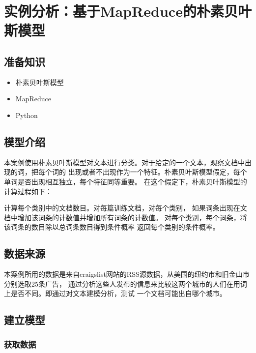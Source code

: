 \section{实例分析：基于MapReduce的朴素贝叶斯模型}\label{ux5b9eux4f8bux5206ux6790ux57faux4e8emapreduceux7684ux6734ux7d20ux8d1dux53f6ux65afux6a21ux578b}

\subsection{准备知识}\label{ux51c6ux5907ux77e5ux8bc6}

\begin{itemize}
\itemsep1pt\parskip0pt
\item
  朴素贝叶斯模型
\item
  MapReduce
\item
  Python
\end{itemize}

\subsection{模型介绍}\label{ux6a21ux578bux4ecbux7ecd}

本案例使用朴素贝叶斯模型对文本进行分类。对于给定的一个文本，观察文档中出现的词，把每个词的
出现或者不出现作为一个特征。朴素贝叶斯模型假定，每个单词是否出现相互独立，每个特征同等重要。
在这个假定下，朴素贝叶斯模型的计算过程如下：%

计算每个类别中的文档数目。对每篇训练文档，对每个类别，
如果词条出现在文档中增加该词条的计数值并增加所有词条的计数值。
对每个类别，每个词条，将该词条的数目除以总词条数目得到条件概率
返回每个类别的条件概率。

\subsection{数据来源}\label{ux6570ux636eux6765ux6e90}

本案例所用的数据是来自craigslist网站的RSS源数据，从美国的纽约市和旧金山市分别选取25条广告，
通过分析这些人发布的信息来比较这两个城市的人们在用词上是否不同。即通过对文本建模分析，测试
一个文档可能出自哪个城市。

\subsection{建立模型}\label{ux5efaux7acbux6a21ux578b}

\subsubsection{获取数据}\label{ux83b7ux53d6ux6570ux636e}

